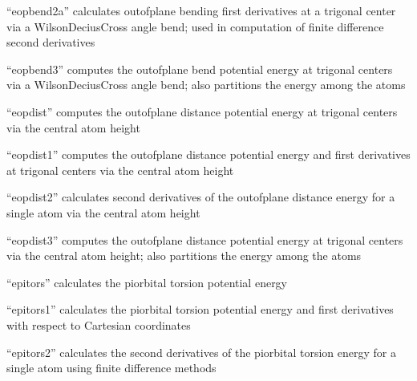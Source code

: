 \documentclass[letterpaper,11pt,english]{sphinxmanual}
\begin{document}

“eopbend2a” calculates out\sphinxhyphen{}of\sphinxhyphen{}plane bending first derivatives at a trigonal center via a Wilson\sphinxhyphen{}Decius\sphinxhyphen{}Cross angle bend; used in computation of finite difference second derivatives


“eopbend3” computes the out\sphinxhyphen{}of\sphinxhyphen{}plane bend potential energy at trigonal centers via a Wilson\sphinxhyphen{}Decius\sphinxhyphen{}Cross angle bend; also partitions the energy among the atoms


“eopdist” computes the out\sphinxhyphen{}of\sphinxhyphen{}plane distance potential energy at trigonal centers via the central atom height


“eopdist1” computes the out\sphinxhyphen{}of\sphinxhyphen{}plane distance potential energy and first derivatives at trigonal centers via the central atom height


“eopdist2” calculates second derivatives of the out\sphinxhyphen{}of\sphinxhyphen{}plane distance energy for a single atom via the central atom height


“eopdist3” computes the out\sphinxhyphen{}of\sphinxhyphen{}plane distance potential energy at trigonal centers via the central atom height; also partitions the energy among the atoms


“epitors” calculates the pi\sphinxhyphen{}orbital torsion potential energy


“epitors1” calculates the pi\sphinxhyphen{}orbital torsion potential energy and first derivatives with respect to Cartesian coordinates


“epitors2” calculates the second derivatives of the pi\sphinxhyphen{}orbital torsion energy for a single atom using finite difference methods

\end{document}
